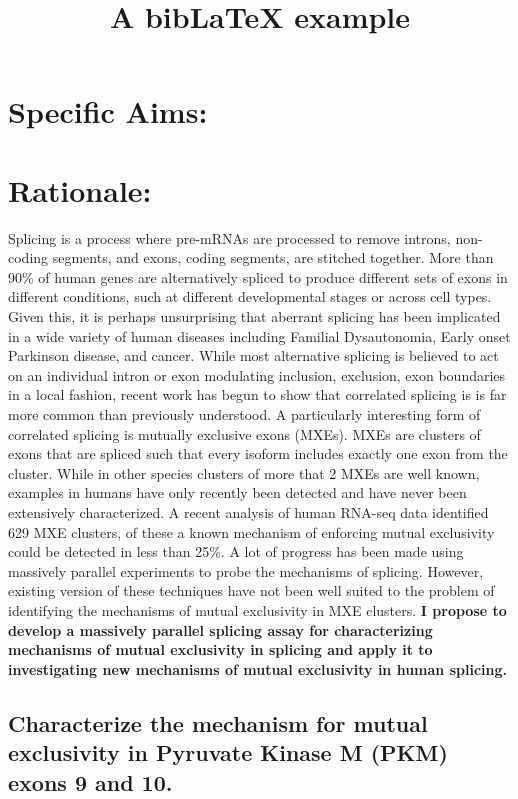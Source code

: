 \documentclass{article}
\title{A bibLaTeX example}
\begin{document}
\section*{Specific Aims:}
%
\section*{Rationale: } Splicing is a process where pre-mRNAs are processed to remove introns, non-coding segments, and exons, coding segments, are stitched together. More than 90\% of human genes are alternatively spliced to produce different sets of exons in different conditions, such at different developmental stages or across cell types.\cite{Wang2008-ej} Given this, it is perhaps unsurprising that aberrant splicing has been implicated in a wide variety of human diseases including Familial Dysautonomia, Early onset Parkinson disease, and cancer.\cite{Scotti2015-yp} While most alternative splicing is believed to act on an individual intron or exon modulating inclusion, exclusion, exon boundaries in a local fashion, recent work has begun to show that correlated splicing is is far more common than previously understood.\cite{Zhu2021-fs, Tilgner2015-sb, Hatje2017-oj} A particularly interesting form of correlated splicing is mutually exclusive exons (MXEs). MXEs are clusters of exons that are spliced such that every isoform includes exactly one exon from the cluster. While in other species clusters of more that 2 MXEs are well known, examples in humans have only recently been detected and have never been extensively characterized.\cite{Jin2018-tq, Hatje2017-oj} A recent analysis of human RNA-seq data identified 629 MXE clusters, of these a known mechanism of enforcing mutual exclusivity could be detected in less than 25\%.\cite{Hatje2017-oj} A lot of progress has been made using massively parallel experiments to probe the mechanisms of splicing.\cite{Ke2018-af, Julien2016-wa, Adamson2018-va, Soemedi2017-pz, Cortes-Lopez2022-gy, Schirman2021-ss, Mikl2019-ng, Braun2018-mb, Soucek2019-iq, Baeza-Centurion2020-tn, Cheung2019-ah, Baeza-Centurion2019-hz, Rosenberg2015-zs, Wong2018-vq} However, existing version of these techniques have not been well suited to the problem of identifying the mechanisms of mutual exclusivity in MXE clusters. \textbf{I propose to develop a massively parallel splicing assay for characterizing mechanisms of mutual exclusivity in splicing and apply it to investigating new mechanisms of mutual exclusivity in human splicing.}
%
\subsection{Characterize the mechanism for mutual exclusivity in Pyruvate Kinase M (PKM) exons 9 and 10.}
%
\end{document}

